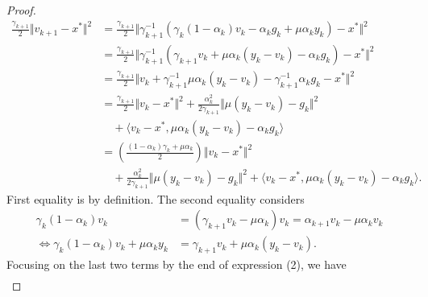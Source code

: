 \documentclass[12pt]{article}
\begin{document}
\begin{proof}
\begin{align*}
            \frac{\gamma_{k + 1}}{2}\Vert v_{k + 1} - x^* \Vert^2
            &= 
            \frac{\gamma_{k + 1}}{2}\Vert 
                \gamma_{k + 1}^{-1}
                (
                    \gamma_k(1 - \alpha_k)v_k - 
                    \alpha_k g_k + \mu \alpha_k y_k
                )
                - x^* 
            \Vert^2
            \\
            &=  
            \frac{\gamma_{k + 1}}{2}
            \Vert 
                \gamma_{k + 1}^{-1}
                (
                \gamma_{k + 1} v_k + \mu \alpha_k(y_k - v_k)
                    - \alpha_k g_k
                )
                - x^* 
            \Vert^2
            \\
            &= 
            \frac{\gamma_{k + 1}}{2}
            \Vert 
                v_k + \gamma_{k + 1}^{-1} \mu \alpha_k (y_k - v_k)
                - \gamma_{k + 1}^{-1}\alpha_k g_k
                - x^* 
            \Vert^2
            \\
            &= 
            \frac{\gamma_{k + 1}}{2}
            \Vert v_k - x^*\Vert^2 
            + 
            \frac{\alpha_k^2}{2\gamma_{k + 1}}\Vert \mu(y_k - v_k) - g_k\Vert^2 
            \\ &\quad 
                + 
                \langle v_k - x^*, \mu \alpha_k(y_k - v_k) - \alpha_k g_k\rangle
            \\
            &= 
            \left(
            \frac{(1 - \alpha_k)\gamma_k + \mu \alpha_k}{2} 
            \right)\Vert v_k - x^*\Vert^2
            \\ &\quad
                + 
                \frac{\alpha_k^2}{2\gamma_{k + 1}}
                \Vert \mu(y_k - v_k) - g_k\Vert^2 
                + 
                \langle v_k - x^*, \mu \alpha_k(y_k - v_k) - \alpha_k g_k\rangle. 
        \tag{2*}
        \end{align*}
        First equality is by definition. 
        The second equality considers 
        \begin{align*}
            \gamma_k(1 - \alpha_k) v_k &= 
            (\gamma_{k + 1} v_k - \mu \alpha_k)v_k
            = \alpha_{k + 1} v_k - \mu\alpha_k v_k
            \\
            \iff 
            \gamma_k(1 - \alpha_k) v_k + \mu \alpha_k y_k
            &= 
            \gamma_{k + 1} v_k + \mu \alpha_k(y_k - v_k). 
        \end{align*}
        Focusing on the last two terms by the end of expression (2), we have  
        \begin{align*}

\end{align*}
\end{proof}
\end{document}
